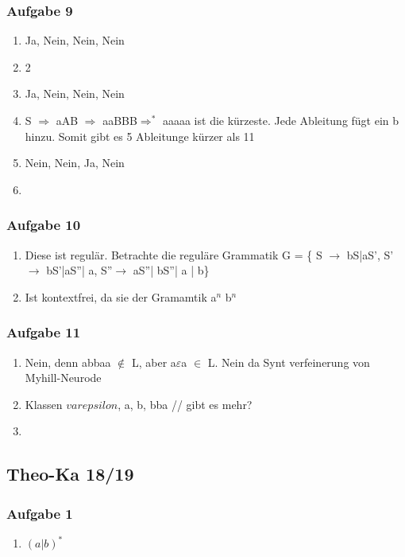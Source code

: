 \documentclass[12pt]{scrartcl}
\begin{document}
\subsubsection{Aufgabe 9}
	\begin{enumerate}
		\item Ja, Nein, Nein, Nein
		\item 2
		\item Ja, Nein, Nein, Nein
		\item S $\Rightarrow$ aAB $\Rightarrow$ aaBBB$\Rightarrow^{*}$ aaaaa ist die kürzeste. Jede Ableitung fügt ein b hinzu. Somit gibt es 5 Ableitunge kürzer als 11
	\item Nein, Nein, Ja, Nein
	\item
	\end{enumerate}
\subsubsection{Aufgabe 10}
	\begin{enumerate}
		\item Diese ist regulär. Betrachte die reguläre Grammatik G = \{ S $\rightarrow$ bS|aS', S' $\rightarrow$ bS'|aS''| a, S''$\rightarrow$ aS''| bS''| a | b\}
		\item Ist kontextfrei, da sie der Gramamtik a$^{n}$ b$^{n}$
	\end{enumerate}
	
\subsubsection{Aufgabe 11}
\begin{enumerate}
	\item Nein, denn abbaa $\notin$ L, aber a$\varepsilon$a $\in$ L. Nein da Synt verfeinerung von Myhill-Neurode
	\item Klassen $varepsilon$, a, b, bba // gibt es mehr?
	\item 
\end{enumerate}

\subsection{Theo-Ka 18/19}
	\subsubsection{Aufgabe 1}
	\begin{enumerate}
		\item \( (a|b)^{*}  \)
	\end{enumerate}
\end{document}
